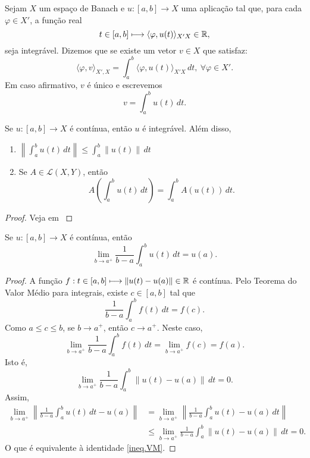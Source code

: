 \begin{definition}
Sejam $X$ um espaço de Banach e $u:[a,b]\longrightarrow X$ uma aplicação tal que, para cada $\varphi\in X'$,  a função real
\[t\in [a,b] \longmapsto \langle\varphi, u(t) \rangle_{X'X}\in \mathbb{R},\]
seja integrável. Dizemos que  se existe um vetor $v\in X$ que satisfaz:
\[\langle \varphi, v\rangle_{X',X}=\int_a^b \langle\varphi, u(t) \rangle_{X'X}\,dt,\ \forall \varphi\in X'.\]
Em caso afirmativo, $v$ é único e escrevemos
\[v=\int_a^b u(t)\,dt.\]
\end{definition}

\begin{proposition}\label{KthA3.2}
Se $u:[a,b]\longrightarrow X$ é {contínua}, então $u$ é integrável. Além disso, 
\begin{enumerate}
    \item $\displaystyle\left\|\int_a^b u(t)\,dt\right\|\leq \int_a^b \|u(t)\|\,dt$
    \item Se $A\in \mathcal{L}(X,Y)$, então
    \[ A\left(\int_a^b u(t)\,dt\right)=\int_a^b A(u(t))\,dt. \]
\end{enumerate}
\end{proposition}
\begin{proof}
Veja em \cite[Theorem A3.2]{kesavan2015topics}
\end{proof}

\begin{proposition}
Se $u:[a,b]\longrightarrow X$ é {contínua}, então
\begin{equation}\label{ineq.VM}
\lim\limits_{b\to a^+} \frac{1}{b-a}\int_a^b u(t)\,dt = u(a).
\end{equation}
\end{proposition}
\begin{proof}
A função  $f:t\in [a,b]\longmapsto \|u(t)-u(a)\|\in \mathbb{R}$ é contínua. Pelo Teorema do Valor Médio para integrais, existe $c\in [a,b]$ tal que 
\[
\frac{1}{b-a}\int_a^b f(t)\,dt=f(c).
\]
Como $a\leq c\leq b$, se $b\to a^+$, então $c\to a^+$. Neste caso, 
\[
\lim_{b\to a^+}\frac{1}{b-a}\int_a^b f(t)\,dt=\lim_{b\to a^+}f(c)=f(a).
\]
Isto é, 
\begin{equation*}
\lim_{b\to a^+}\frac{1}{b-a}\int_a^b \|u(t)-u(a)\|\,dt=0.
\end{equation*}
Assim, 
\begin{align*}
\lim_{b\to a^+}\left\|\frac{1}{b-a}\int_a^b u(t)\,dt -u(a)\right\|& =
\lim_{b\to a^+}\left\|\frac{1}{b-a}\int_a^b u(t)-u(a)\,dt\right\|\\
&\leq \lim_{b\to a^+}\frac{1}{b-a}\int_a^b\left\| u(t)-u(a)\right\|\,dt
=0.
\end{align*}
O que é equivalente à identidade \eqref{ineq.VM}.
\end{proof}